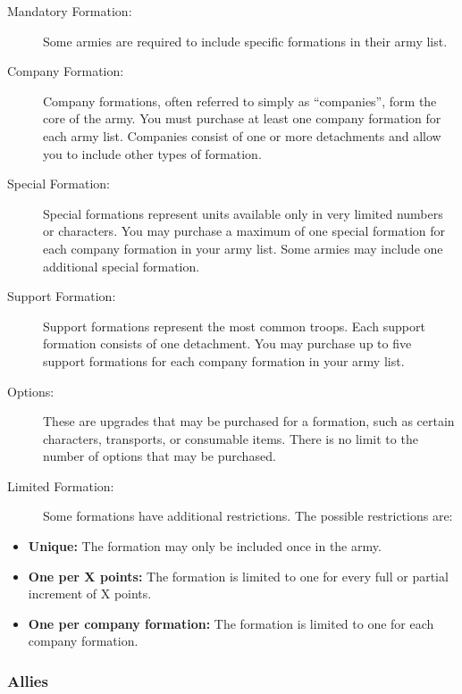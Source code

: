\begin{description}
    \item[Mandatory Formation:] Some armies are required to include specific formations in their army list.

    \item[Company Formation:] Company formations, often referred to simply as ``companies'', form the core of the army. You must purchase at least one company formation for each army list. Companies consist of one or more detachments and allow you to include other types of formation. \relax

    \item[Special Formation:] Special formations represent units available only in very limited numbers or characters. You may purchase a maximum of one special formation for each company formation in your army list. Some armies may include one additional special formation.

    \item[Support Formation:] Support formations represent the most common troops. Each support formation consists of one detachment. You may purchase up to five support formations for each company formation in your army list.

    \item[Options:] These are upgrades that may be purchased for a formation, such as certain characters, transports, or consumable items. There is no limit to the number of options that may be purchased.

    \item[Limited Formation:] Some formations have additional restrictions. The possible restrictions are:
\end{description}

\begin{itemize}
    \item \textbf{Unique:} The formation may only be included once in the army.
    \item \textbf{One per X points:} The formation is limited to one for every full or partial increment of X points.
    \item \textbf{One per company formation:} The formation is limited to one for each company formation.
\end{itemize}

\subsubsection{Allies}

